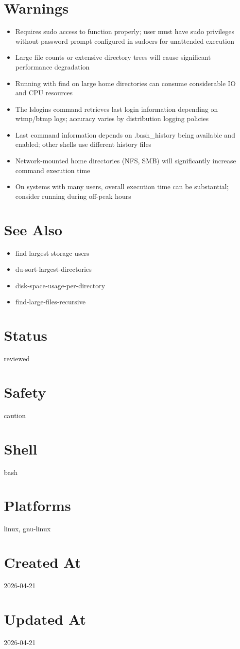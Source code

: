 \documentclass{article}
\begin{document}
\section*{Warnings}
\begin{itemize}
  \item Requires sudo access to function properly; user must have sudo privileges without password prompt configured in sudoers for unattended execution
  \item Large file counts or extensive directory trees will cause significant performance degradation
  \item Running with find on large home directories can consume considerable IO and CPU resources
  \item The lslogins command retrieves last login information depending on wtmp/btmp logs; accuracy varies by distribution logging policies
  \item Last command information depends on .bash\_history being available and enabled; other shells use different history files
  \item Network-mounted home directories (NFS, SMB) will significantly increase command execution time
  \item On systems with many users, overall execution time can be substantial; consider running during off-peak hours
\end{itemize}

\section*{See Also}
\begin{itemize}
  \item find-largest-storage-users
  \item du-sort-largest-directories
  \item disk-space-usage-per-directory
  \item find-large-files-recursive
\end{itemize}

\section*{Status}
reviewed

\section*{Safety}
caution

\section*{Shell}
bash

\section*{Platforms}
linux, gnu-linux

\section*{Created At}
2026-04-21

\section*{Updated At}
2026-04-21
\end{document}
